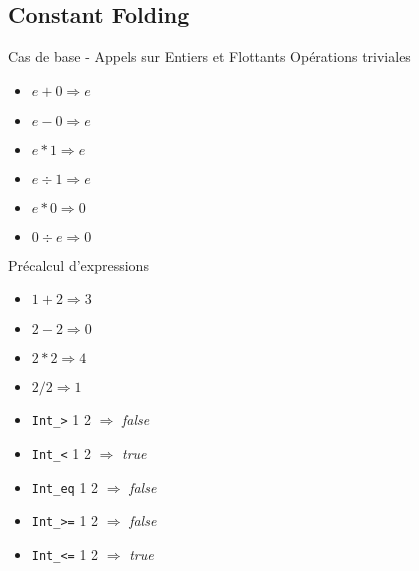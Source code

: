 \documentclass{beamer}
\begin{document}
\subsection{Constant Folding} 

\begin{frame}{Cas de base - Appels sur Entiers et Flottants}
Opérations triviales 
  \begin{multicols}{3}
  \begin{itemize}
    \item $e + 0 \Rightarrow e $
    \item $e - 0 \Rightarrow e $
    \item $e * 1 \Rightarrow e $
    \item $e \div 1 \Rightarrow e $
    \item $e * 0 \Rightarrow 0 $
    \item $0 \div e \Rightarrow 0 $
  \end{itemize}
  \end{multicols}

Précalcul d'expressions
  \begin{multicols}{2}
  \begin{itemize}
    \item $ 1 + 2 \Rightarrow 3 $
    \item $ 2 - 2 \Rightarrow 0 $
    \item $ 2 * 2 \Rightarrow 4 $
    \item $ 2 / 2 \Rightarrow 1 $
    \columnbreak
    \item  \texttt{Int\_>} 1 2 $\Rightarrow$ \emph{false}
    \item  \texttt{Int\_<} 1 2 $\Rightarrow$ \emph{true}
    \item  \texttt{Int\_eq} 1 2 $\Rightarrow$ \emph{false}
    \item  \texttt{Int\_>=} 1 2 $\Rightarrow$ \emph{false}
    \item  \texttt{Int\_<=} 1 2 $\Rightarrow$ \emph{true}
  \end{itemize}
  \end{multicols}

\end{frame}
\end{document}
